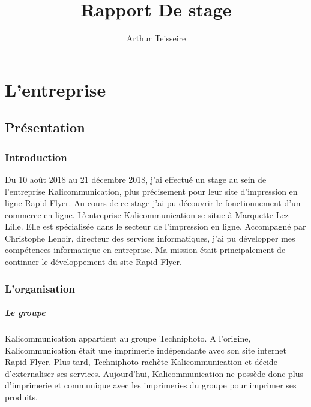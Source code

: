 \documentclass[a4paper]{report}
\title{Rapport De stage}
\author{Arthur Teisseire}
\begin{document}
\tableofcontents
\part{L'entreprise}
\chapter{Présentation}
\section{Introduction}
Du 10 août 2018 au 21 décembre 2018, j'ai effectué un stage au sein de l'entreprise Kalicommunication, plus précisement pour leur site d'impression en ligne Rapid-Flyer. Au cours de ce stage j'ai pu découvrir le fonctionnement d'un commerce en ligne.\newline
L'entreprise Kalicommunication se situe à Marquette-Lez-Lille. Elle est spécialisée dans le secteur de l'impression en ligne.\newline
Accompagné par Christophe Lenoir, directeur des services informatiques, j'ai pu développer mes compétences informatique en entreprise. Ma mission était principalement de continuer le développement du site Rapid-Flyer.
\section{L'organisation}
\subsubsection{Le groupe}
Kalicommunication appartient au groupe Techniphoto. A l'origine, Kalicommunication était une imprimerie indépendante avec son site internet Rapid-Flyer. Plus tard, Techniphoto rachète Kalicommunication et décide d'externaliser ses services. Aujourd'hui, Kalicommunication ne possède donc plus d'imprimerie et communique avec les imprimeries du groupe pour imprimer ses produits.
\end{document}

